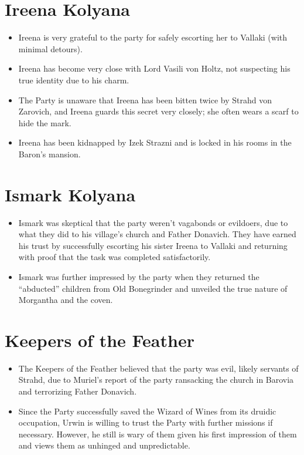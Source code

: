 \documentclass[a4paper,11pt]{article}
\begin{document}
\section{Ireena Kolyana}
\begin{itemize}
  \item Ireena is very grateful to the party for safely escorting her to Vallaki (with minimal detours).
  \item Ireena has become very close with Lord Vasili von Holtz, not suspecting his true identity due to his 
  charm.
  \item The Party is unaware that Ireena has been bitten twice by Strahd von Zarovich, and Ireena guards this
  secret very closely; she often wears a scarf to hide the mark.
  \item Ireena has been kidnapped by Izek Strazni and is locked in his rooms in the Baron's mansion.
\end{itemize}

\section{Ismark Kolyana}
\begin{itemize}
  \item Ismark was skeptical that the party weren't vagabonds or evildoers, due to what they did to his village's 
  church and Father Donavich. They have earned his trust by successfully escorting his sister Ireena to Vallaki 
  and returning with proof that the task was completed satisfactorily.
  \item Ismark was further impressed by the party when they returned the ``abducted'' children from Old 
  Bonegrinder and unveiled the true nature of Morgantha and the coven.
\end{itemize}

\section{Keepers of the Feather}
\begin{itemize}
  \item The Keepers of the Feather believed that the party was evil, likely servants of Strahd, due to Muriel's 
  report of the party ransacking the church in Barovia and terrorizing Father Donavich.
  \item Since the Party successfully saved the Wizard of Wines from its druidic occupation, Urwin is willing to 
  trust the Party with further missions if necessary. However, he still is wary of them given his first impression 
  of them and views them as unhinged and unpredictable.
\end{itemize}
\end{document}

